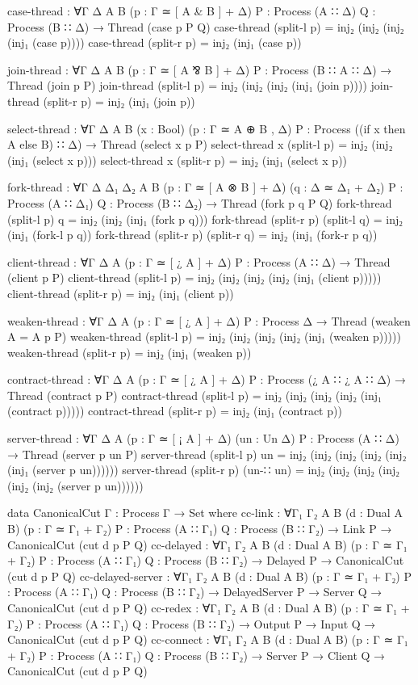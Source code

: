 \begin{code}
case-thread :
  ∀{Γ Δ A B} (p : Γ ≃ [ A & B ] + Δ) {P : Process (A ∷ Δ)} {Q : Process (B ∷ Δ)} →
  Thread (case p P Q)
case-thread (split-l p) = inj₂ (inj₂ (inj₂ (inj₁ (case p))))
case-thread (split-r p) = inj₂ (inj₁ (case p))

join-thread :
  ∀{Γ Δ A B} (p : Γ ≃ [ A ⅋ B ] + Δ) {P : Process (B ∷ A ∷ Δ)} →
  Thread (join p P)
join-thread (split-l p) = inj₂ (inj₂ (inj₂ (inj₁ (join p))))
join-thread (split-r p) = inj₂ (inj₁ (join p))

select-thread :
  ∀{Γ Δ A B} (x : Bool) (p : Γ ≃ A ⊕ B , Δ) {P : Process ((if x then A else B) ∷ Δ)} →
  Thread (select x p P)
select-thread x (split-l p) = inj₂ (inj₂ (inj₁ (select x p)))
select-thread x (split-r p) = inj₂ (inj₁ (select x p))

fork-thread :
  ∀{Γ Δ Δ₁ Δ₂ A B} (p : Γ ≃ [ A ⊗ B ] + Δ) (q : Δ ≃ Δ₁ + Δ₂)
  {P : Process (A ∷ Δ₁)} {Q : Process (B ∷ Δ₂)} →
  Thread (fork p q P Q)
fork-thread (split-l p) q = inj₂ (inj₂ (inj₁ (fork p q)))
fork-thread (split-r p) (split-l q) = inj₂ (inj₁ (fork-l p q))
fork-thread (split-r p) (split-r q) = inj₂ (inj₁ (fork-r p q))

client-thread :
  ∀{Γ Δ A} (p : Γ ≃ [ ¿ A ] + Δ)
  {P : Process (A ∷ Δ)} →
  Thread (client p P)
client-thread (split-l p) = inj₂ (inj₂ (inj₂ (inj₂ (inj₁ (client p)))))
client-thread (split-r p) = inj₂ (inj₁ (client p))

weaken-thread :
  ∀{Γ Δ A} (p : Γ ≃ [ ¿ A ] + Δ)
  {P : Process Δ} →
  Thread (weaken {A = A} p P)
weaken-thread (split-l p) = inj₂ (inj₂ (inj₂ (inj₂ (inj₁ (weaken p)))))
weaken-thread (split-r p) = inj₂ (inj₁ (weaken p))

contract-thread :
  ∀{Γ Δ A} (p : Γ ≃ [ ¿ A ] + Δ)
  {P : Process (¿ A ∷ ¿ A ∷ Δ)} →
  Thread (contract p P)
contract-thread (split-l p) = inj₂ (inj₂ (inj₂ (inj₂ (inj₁ (contract p)))))
contract-thread (split-r p) = inj₂ (inj₁ (contract p))

server-thread :
  ∀{Γ Δ A} (p : Γ ≃ [ ¡ A ] + Δ) (un : Un Δ) {P : Process (A ∷ Δ)} →
  Thread (server p un P)
server-thread (split-l p) un = inj₂ (inj₂ (inj₂ (inj₂ (inj₂ (inj₁ (server p un))))))
server-thread (split-r p) (un-∷ un) = inj₂ (inj₂ (inj₂ (inj₂ (inj₂ (inj₂ (server p un))))))

data CanonicalCut {Γ} : Process Γ → Set where
  cc-link :
    ∀{Γ₁ Γ₂ A B} (d : Dual A B) (p : Γ ≃ Γ₁ + Γ₂)
    {P : Process (A ∷ Γ₁)} {Q : Process (B ∷ Γ₂)} →
    Link P → CanonicalCut (cut d p P Q)
  cc-delayed :
    ∀{Γ₁ Γ₂ A B} (d : Dual A B) (p : Γ ≃ Γ₁ + Γ₂)
    {P : Process (A ∷ Γ₁)} {Q : Process (B ∷ Γ₂)} →
    Delayed P → CanonicalCut (cut d p P Q)
  cc-delayed-server :
    ∀{Γ₁ Γ₂ A B} (d : Dual A B) (p : Γ ≃ Γ₁ + Γ₂)
    {P : Process (A ∷ Γ₁)} {Q : Process (B ∷ Γ₂)} →
    DelayedServer P → Server Q → CanonicalCut (cut d p P Q)
  cc-redex :
    ∀{Γ₁ Γ₂ A B} (d : Dual A B) (p : Γ ≃ Γ₁ + Γ₂)
    {P : Process (A ∷ Γ₁)} {Q : Process (B ∷ Γ₂)} →
    Output P → Input Q → CanonicalCut (cut d p P Q)
  cc-connect :
    ∀{Γ₁ Γ₂ A B} (d : Dual A B) (p : Γ ≃ Γ₁ + Γ₂)
    {P : Process (A ∷ Γ₁)} {Q : Process (B ∷ Γ₂)} →
    Server P → Client Q → CanonicalCut (cut d p P Q)


\end{code}
